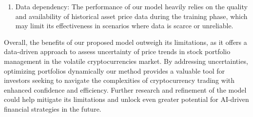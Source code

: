 \begin{enumerate}
	
	\item Data dependency: The performance of our model heavily relies on the quality and availability of historical asset price data during the training phase, which may limit its effectiveness in scenarios where data is scarce or unreliable.
	
	
\end{enumerate}


Overall, the benefits of our proposed model outweigh its limitations, as it offers a data-driven approach to assess uncertainty of price trends in stock portfolio management in the volatile cryptocurrencies market. By addressing uncertainties, optimizing portfolios dynamically our method provides a valuable tool for investors seeking to navigate the complexities of cryptocurrency trading with enhanced confidence and efficiency. Further research and refinement of the model could help mitigate its limitations and unlock even greater potential for AI-driven financial strategies in the future.